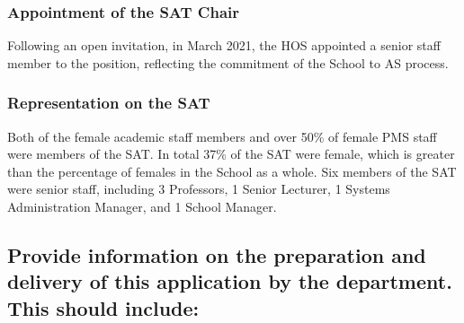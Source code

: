 


\subsubsection{Appointment of the SAT Chair}
Following an open invitation, in March 2021, 
the \ac{HOS} appointed a senior staff member to the position, reflecting the commitment of the School to AS process. 


\subsubsection{Representation on the SAT}

Both of the female academic staff members and over 50\% of female PMS staff were members of the SAT. 
In total 37\% of the SAT were female, which is greater than the percentage of females in the School as a whole.
Six members of the SAT were senior staff, including 3 Professors, 1 Senior Lecturer, 1 Systems Administration Manager, and 1 School Manager. 


\subsection{Provide information on the preparation and delivery of this application by the department. This should include:}


